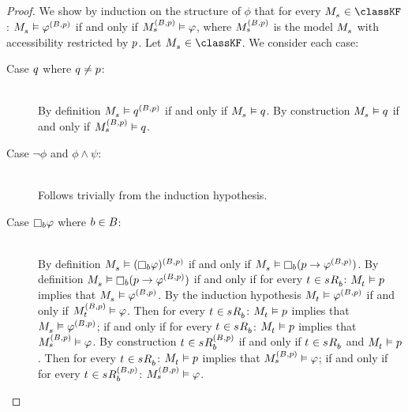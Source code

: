 \begin{proof}
We show by induction on the structure of $\phi$ that for every $\kPModel{\kStateS} \in \classKF$: $\kPModel{\kStateS} \entails \phi^{(\agentsB, \atomP)}$ if and only if $\kPModel[(\agentsB, \atomP)]{\kStateS} \entails \phi$, where $\kPModel[(\agentsB, \atomP)]{\kStateS}$ is the model $\kPModel{\kStateS}$ with accessibility restricted by $p$.
Let $\kPModel{\kStateS} \in \classKF$.
We consider each case:
\begin{description}
    \item[Case $q$ where $q \neq p$:] \hfill\\
        By definition $\kPModel{\kStateS} \entails \atomQ^{(\agentsB, \atomP)}$ if and only if $\kPModel{\kStateS} \entails \atomQ$.
        By construction $\kPModel{\kStateS} \entails \atomQ$ if and only if $\kPModel[(\agentsB, \atomP)]{\kStateS} \entails \atomQ$.
    \item[Case $\lnot \phi$ and $\phi \land \psi$:] \hfill\\
        Follows trivially from the induction hypothesis.
    \item[Case $\necessaryB \phi$ where $b \in B$:] \hfill\\
        By definition $\kPModel{\kStateS} \entails (\necessaryB \phi)^{(\agentsB, \atomP)}$ if and only if $\kPModel{\kStateS} \entails \necessaryB (\atomP \implies \phi^{(\agentsB, \atomP)})$.
        By definition $\kPModel{\kStateS} \entails \necessaryB (\atomP \implies \phi^{(\agentsB, \atomP)})$ if and only if for every $\kStateT \in \kSuccessorsB{\kStateS}$: $\kPModel{\kStateT} \entails \atomP$ implies that  $\kPModel{\kStateS} \entails \phi^{(\agentsB, \atomP)}$.
        By the induction hypothesis $\kPModel{\kStateT} \entails \phi^{(\agentsB, \atomP)}$ if and only if $\kPModel[(\agentsB, \atomP)]{\kStateT} \entails \phi$.
        Then for every $\kStateT \in \kSuccessorsB{\kStateS}$: $\kPModel{\kStateT} \entails \atomP$ implies that  $\kPModel{\kStateS} \entails \phi^{(\agentsB, \atomP)}$; if and only if for every $\kStateT \in \kSuccessorsB{\kStateS}$: $\kPModel{\kStateT} \entails \atomP$ implies that $\kPModel[(\agentsB, \atomP)]{\kStateS} \entails \phi$.
        By construction $\kStateT \in \kSuccessorsB[(\agentsB, \atomP)]{\kStateS}$ if and only if $\kStateT \in \kSuccessorsB{\kStateS}$ and $\kPModel{\kStateT} \entails \atomP$.
        Then for every $\kStateT \in \kSuccessorsB{\kStateS}$: $\kPModel{\kStateT} \entails \atomP$ implies that $\kPModel[(\agentsB, \atomP)]{\kStateS} \entails \phi$; if and only if for every $\kStateT \in \kSuccessorsB[(\agentsB, \atomP)]{\kStateS}$: $\kPModel[(\agentsB, \atomP)]{\kStateS} \entails \phi$.

\end{description}
\end{proof}
